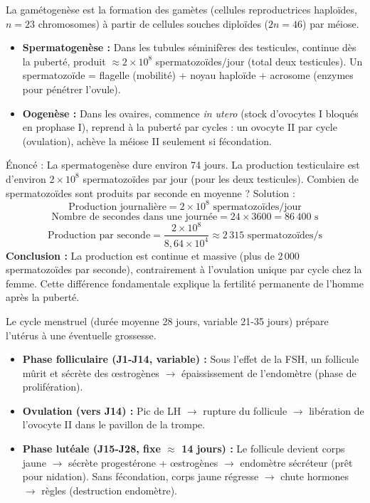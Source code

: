 \documentclass[11pt]{article}
\newcommand{\cle}[1]{{\popxbold\color{popdark}#1}}
\newcounter{popsec}
\newcounter{popsub}
\newcommand{\courssub}[1]{%
  \stepcounter{popsub}%
  \par\vspace{9pt}\noindent{\popxbold\fontsize{11.5}{13}\selectfont\color{popink}{\color{poporange}\thepopsec.\thepopsub}\hspace{6pt}#1}\par\nopagebreak\vspace{4pt}
}
\begin{document}
\begin{definition}[Gamétogenèse]
La \cle{gamétogenèse} est la formation des gamètes (cellules reproductrices haploïdes, $n=23$ chromosomes) à partir de cellules souches diploïdes ($2n=46$) par méiose.
\begin{itemize}
    \item \textbf{Spermatogenèse :} Dans les tubules séminifères des testicules, continue dès la puberté, produit $\approx 2 \times 10^8$ spermatozoïdes/jour (total deux testicules). Un spermatozoïde = flagelle (mobilité) + noyau haploïde + acrosome (enzymes pour pénétrer l'ovule).
    \item \textbf{Oogenèse :} Dans les ovaires, commence \emph{in utero} (stock d'ovocytes I bloqués en prophase I), reprend à la puberté par cycles : un ovocyte II par cycle (ovulation), achève la méiose II seulement si fécondation.
\end{itemize}
\end{definition}

\begin{exoresolu}
Énoncé : La spermatogenèse dure environ 74 jours. La production testiculaire est d'environ $2 \times 10^8$ spermatozoïdes par jour (pour les deux testicules). Combien de spermatozoïdes sont produits par seconde en moyenne ?
\tcblower
Solution :
\[
\text{Production journalière} = 2 \times 10^8 \text{ spermatozoïdes/jour}
\]
\[
\text{Nombre de secondes dans une journée} = 24 \times 3600 = 86\,400 \text{ s}
\]
\[
\text{Production par seconde} = \frac{2 \times 10^8}{8,64 \times 10^4} \approx 2\,315 \text{ spermatozoïdes/s}
\]
\textbf{Conclusion :} La production est continue et massive (plus de 2\,000 spermatozoïdes par seconde), contrairement à l'ovulation unique par cycle chez la femme. Cette différence fondamentale explique la fertilité permanente de l'homme après la puberté.
\end{exoresolu}

\courssub{Du cycle menstruel à la fécondation}

\begin{definition}
Le \cle{cycle menstruel} (durée moyenne 28 jours, variable 21-35 jours) prépare l'utérus à une éventuelle grossesse.
\begin{itemize}
    \item \textbf{Phase folliculaire (J1-J14, variable) :} Sous l'effet de la FSH, un follicule mûrit et sécrète des œstrogènes $\rightarrow$ épaississement de l'endomètre (phase de prolifération).
    \item \textbf{Ovulation (vers J14) :} Pic de LH $\rightarrow$ rupture du follicule $\rightarrow$ libération de l'ovocyte II dans le pavillon de la trompe.
    \item \textbf{Phase lutéale (J15-J28, fixe $\approx$ 14 jours) :} Le follicule devient corps jaune $\rightarrow$ sécrète progestérone + œstrogènes $\rightarrow$ endomètre sécréteur (prêt pour nidation). Sans fécondation, corps jaune régresse $\rightarrow$ chute hormones $\rightarrow$ règles (destruction endomètre).
\end{itemize}
\end{definition}
\end{document}

